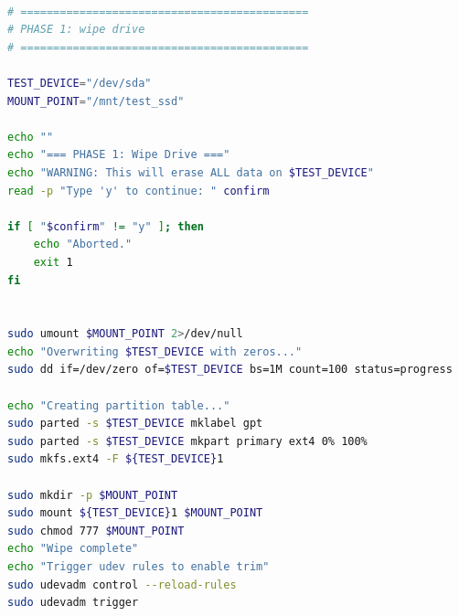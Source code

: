 \begin{lstlisting}[language=bash, caption={PHASE 1: wipe drive and prepare for experiment}]

# ============================================
# PHASE 1: wipe drive
# ============================================

TEST_DEVICE="/dev/sda"
MOUNT_POINT="/mnt/test_ssd"

echo ""
echo "=== PHASE 1: Wipe Drive ==="
echo "WARNING: This will erase ALL data on $TEST_DEVICE"
read -p "Type 'y' to continue: " confirm

if [ "$confirm" != "y" ]; then
    echo "Aborted."
    exit 1
fi


sudo umount $MOUNT_POINT 2>/dev/null
echo "Overwriting $TEST_DEVICE with zeros..."
sudo dd if=/dev/zero of=$TEST_DEVICE bs=1M count=100 status=progress

echo "Creating partition table..."
sudo parted -s $TEST_DEVICE mklabel gpt
sudo parted -s $TEST_DEVICE mkpart primary ext4 0% 100%
sudo mkfs.ext4 -F ${TEST_DEVICE}1

sudo mkdir -p $MOUNT_POINT
sudo mount ${TEST_DEVICE}1 $MOUNT_POINT
sudo chmod 777 $MOUNT_POINT
echo "Wipe complete"
echo "Trigger udev rules to enable trim"
sudo udevadm control --reload-rules
sudo udevadm trigger
\end{lstlisting}

